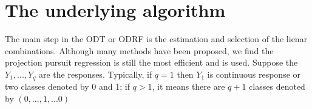 \documentclass[nojss]{jss}
\numberwithin{equation}{section}
\begin{document}
\section{The underlying algorithm} \label{sec:models}


The main step in the ODT or ODRF is the estimation and selection of the lienar combinations. Although many methods have been proposed, we find the projection pursuit regression is still the most efficient and is used. Suppose the $ Y_1, ..., Y_q $ are the responses. Typically, if $ q = 1$ then  $ Y_1 $ is continuous response or two classes denoted by 0 and 1; if $ q > 1$, it means there are $ q+1 $ classes denoted by $ (0, ..., 1, ...0)    $
\end{document}
